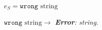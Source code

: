 \begin{case}

$e_{S}=\mathtt{wrong}$ $\mathrm{string}$

$\mathtt{wrong}$ $\mathrm{string}\rightarrow$ \emph{\textbf{Error}: string}.

\end{case}